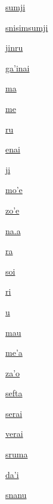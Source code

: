 {\hyperlink{val:sumji}{sumji}}{}{}{}

{\hyperlink{val:snisimsumji}{snisimsumji}}{}{}{}

{\hyperlink{val:jinru}{jinru}}{}{}{}

{\hyperlink{val:gahinai}{ga'inai}}{}{}{}

{\hyperlink{val:ma}{ma}}{}{}{}

{\hyperlink{val:me}{me}}{}{}{}

{\hyperlink{val:ru}{ru}}{}{}{}

{\hyperlink{val:enai}{enai}}{}{}{}

{\hyperlink{val:ji}{ji}}{}{}{}

{\hyperlink{val:mohe}{mo'e}}{}{}{}

{\hyperlink{val:zohe}{zo'e}}{}{}{}

{\hyperlink{val:na.a}{na.a}}{}{}{}

{\hyperlink{val:ra}{ra}}{}{}{}

{\hyperlink{val:soi}{soi}}{}{}{}

{\hyperlink{val:ri}{ri}}{}{}{}

{\hyperlink{val:u}{u}}{}{}{}

{\hyperlink{val:mau}{mau}}{}{}{}

{\hyperlink{val:meha}{me'a}}{}{}{}

{\hyperlink{val:zaho}{za'o}}{}{}{}

{\hyperlink{val:sefta}{sefta}}{}{}{}

{\hyperlink{val:serai}{serai}}{}{}{}

{\hyperlink{val:verai}{verai}}{}{}{}

{\hyperlink{val:sruma}{sruma}}{}{}{}

{\hyperlink{val:dahi}{da'i}}{}{}{}

{\hyperlink{val:snanu}{snanu}}{}{}{}

